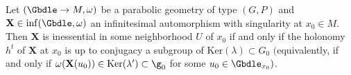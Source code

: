 \begin{Theorem} \label{local essential dictionary} Let $(\Gbdle \rightarrow M,\omega)$ be a parabolic geometry of type $(G,P)$ and $\mathbf{X} \in \mathrm{inf}(\Gbdle,\omega)$ an infinitesimal automorphism with singularity at $x_0 \in M$. Then $\mathbf{X}$ is inessential in some neighborhood $U$ of $x_0$ if and only if the holonomy $h^t$ of $\mathbf{X}$ at $x_0$ is up to conjugacy a subgroup of $\mathrm{Ker}(\lambda) \subset G_0$ $($equivalently, if and only if $\omega(\mathbf{X}(u_0)) \in \mathrm{Ker}(\lambda') \subset \g_0$ for some $u_0 \in \Gbdle_{x_0})$.
\end{Theorem}
